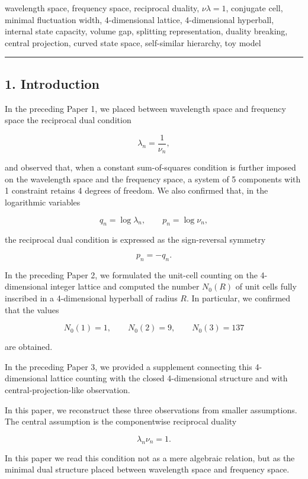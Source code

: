 \documentclass[
]{article}
\begin{document}
wavelength space, frequency space, reciprocal duality, \(\nu\lambda=1\),
conjugate cell, minimal fluctuation width, 4-dimensional lattice,
4-dimensional hyperball, internal state capacity, volume gap, splitting
representation, duality breaking, central projection, curved state
space, self-similar hierarchy, toy model

\begin{center}\rule{0.5\linewidth}{0.5pt}\end{center}

\subsection{1. Introduction}\label{introduction}

In the preceding Paper 1, we placed between wavelength space and
frequency space the reciprocal dual condition

\[
\lambda_n=\frac{1}{\nu_n},
\]

and observed that, when a constant sum-of-squares condition is further
imposed on the wavelength space and the frequency space, a system of 5
components with 1 constraint retains 4 degrees of freedom. We also
confirmed that, in the logarithmic variables

\[
q_n=\log\lambda_n,\qquad p_n=\log\nu_n,
\]

the reciprocal dual condition is expressed as the sign-reversal symmetry

\[
p_n=-q_n.
\]

In the preceding Paper 2, we formulated the unit-cell counting on the
4-dimensional integer lattice and computed the number \(N_0(R)\) of unit
cells fully inscribed in a 4-dimensional hyperball of radius \(R\). In
particular, we confirmed that the values

\[
N_0(1)=1,\qquad N_0(2)=9,\qquad N_0(3)=137
\]

are obtained.

In the preceding Paper 3, we provided a supplement connecting this
4-dimensional lattice counting with the closed 4-dimensional structure
and with central-projection-like observation.

In this paper, we reconstruct these three observations from smaller
assumptions. The central assumption is the componentwise reciprocal
duality

\[
\lambda_n\nu_n=1.
\]

In this paper we read this condition not as a mere algebraic relation,
but as the minimal dual structure placed between wavelength space and
frequency space.
\end{document}
